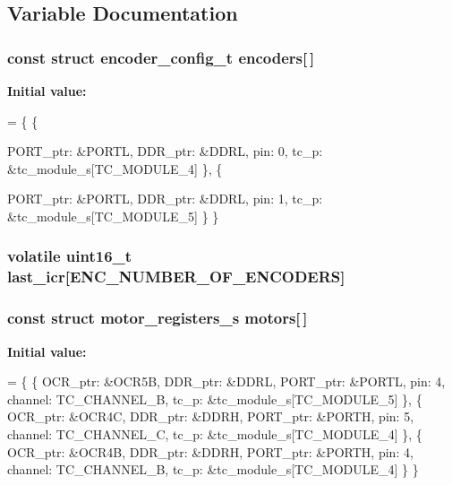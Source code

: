 \subsection{Variable Documentation}
\subsubsection[{encoders}]{\setlength{\rightskip}{0pt plus 5cm}const struct {\bf encoder\+\_\+config\+\_\+t} encoders[$\,$]\hspace{0.3cm}{\ttfamily [static]}}\label{motion_8c_ab54e9edf33c8902ef09b0cbbd2cfb415}
{\bfseries Initial value\+:}
\begin{DoxyCode}
=
\{
    \{   
        
        PORT_ptr:   &PORTL,
        DDR_ptr:    &DDRL,
        pin:        0,
        tc_p:       &tc_module_s[TC_MODULE_4]
    \},
    \{   
        
        PORT_ptr:   &PORTL,
        DDR_ptr:    &DDRL,
        pin:        1,
        tc_p:       &tc_module_s[TC_MODULE_5]
    \}
\}
\end{DoxyCode}
\subsubsection[{last\+\_\+icr}]{\setlength{\rightskip}{0pt plus 5cm}volatile uint16\+\_\+t last\+\_\+icr[{\bf E\+N\+C\+\_\+\+N\+U\+M\+B\+E\+R\+\_\+\+O\+F\+\_\+\+E\+N\+C\+O\+D\+E\+RS}]\hspace{0.3cm}{\ttfamily [static]}}\label{motion_8c_af7d11c64d22fba3335328da703a0d8f7}
\subsubsection[{motors}]{\setlength{\rightskip}{0pt plus 5cm}const struct {\bf motor\+\_\+registers\+\_\+s} motors[$\,$]\hspace{0.3cm}{\ttfamily [static]}}\label{motion_8c_a007234beb28514edab2e9b8538441a66}
{\bfseries Initial value\+:}
\begin{DoxyCode}
=
\{
    \{   
        OCR_ptr:    &OCR5B,
        DDR_ptr:    &DDRL,
        PORT_ptr:   &PORTL,
        pin:        4,
        channel:    TC_CHANNEL_B,
        tc_p:       &tc_module_s[TC_MODULE_5]
    \},
    \{   
        OCR_ptr:    &OCR4C,
        DDR_ptr:    &DDRH,
        PORT_ptr:   &PORTH,
        pin:        5,
        channel:    TC_CHANNEL_C,
        tc_p:       &tc_module_s[TC_MODULE_4]
    \},
    \{   
        OCR_ptr:    &OCR4B,
        DDR_ptr:    &DDRH,
        PORT_ptr:   &PORTH,
        pin:        4,
        channel:    TC_CHANNEL_B,
        tc_p:       &tc_module_s[TC_MODULE_4]
    \}
\}
\end{DoxyCode}
